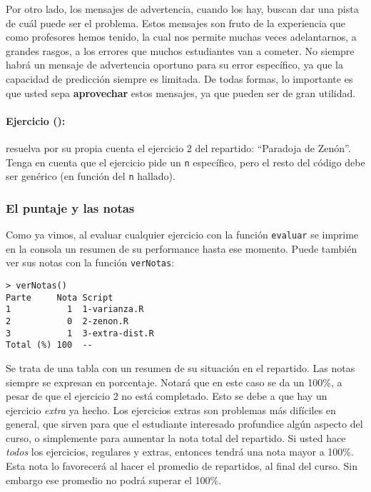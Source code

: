 \documentclass[]{article}
\begin{document}
Por otro lado, los mensajes de advertencia, cuando los hay, buscan dar
una pista de cuál puede ser el problema. Estos mensajes son fruto de la
experiencia que como profesores hemos tenido, la cual nos permite muchas
veces adelantarnos, a grandes rasgos, a los errores que muchos
estudiantes van a cometer. No siempre habrá un mensaje de advertencia
oportuno para su error específico, ya que la capacidad de predicción
siempre es limitada. De todas formas, lo importante es que usted sepa
\textbf{aprovechar} estos mensajes, ya que pueden ser de gran utilidad.

\paragraph{Ejercicio ():}

resuelva por su propia cuenta el ejercicio 2 del repartido: ``Paradoja
de Zenón''. Tenga en cuenta que el ejercicio pide un \texttt{n}
específico, pero el resto del código debe ser genérico (en función del
\texttt{n} hallado).

\subsubsection{El puntaje y las notas}

Como ya vimos, al evaluar cualquier ejercicio con la función
\texttt{evaluar} se imprime en la consola un resumen de su performance
hasta ese momento. Puede también ver sus notas con la función
\texttt{verNotas}:

\begin{verbatim}
> verNotas()
Parte     Nota Script        
1           1  1-varianza.R  
2           0  2-zenon.R     
3           1  3-extra-dist.R
Total (%) 100  --       
\end{verbatim}
Se trata de una tabla con un resumen de su situación en el repartido.
Las notas siempre se expresan en porcentaje. Notará que en este caso se
da un 100\%, a pesar de que el ejercicio 2 no está completado. Esto se
debe a que hay un ejercicio \emph{extra} ya hecho. Los ejercicios extras
son problemas más difíciles en general, que sirven para que el
estudiante interesado profundice algún aspecto del curso, o simplemente
para aumentar la nota total del repartido. Si usted hace \emph{todos}
los ejercicios, regulares y extras, entonces tendrá una nota mayor a
100\%. Esta nota lo favorecerá al hacer el promedio de repartidos, al
final del curso. Sin embargo ese promedio no podrá superar el 100\%.
\end{document}
